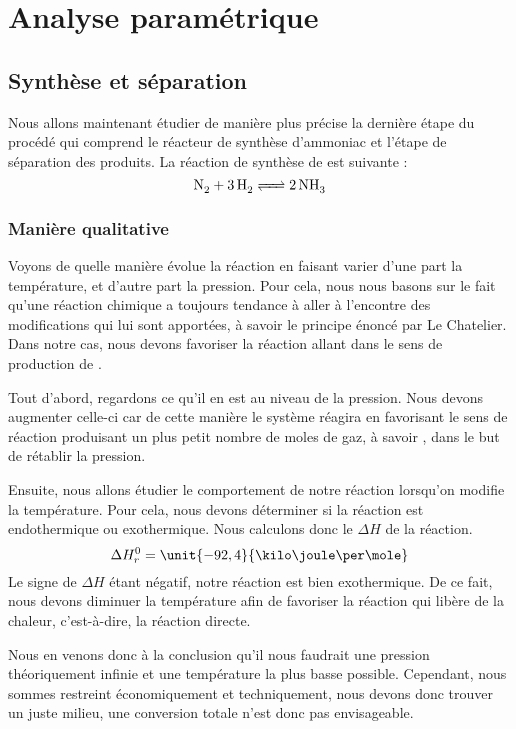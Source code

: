 \chapter{Analyse paramétrique}
\section{Synthèse  et séparation}

Nous allons maintenant étudier de manière plus précise la dernière étape du procédé qui comprend le réacteur de synthèse d’ammoniac et l'étape de séparation des produits.
La réaction de synthèse de  est suivante :
\[ \ce{N_2 + 3H2 <=> 2NH3} \]

\subsection{Manière qualitative}

Voyons de quelle manière évolue la réaction en faisant varier d'une part la température, et d'autre part la pression. Pour cela, nous nous basons sur le fait qu'une réaction chimique a toujours tendance à   aller à l'encontre des modifications qui lui sont apportées, à savoir le principe énoncé par Le Chatelier. Dans notre cas, nous devons favoriser la réaction allant dans le sens de production de .

Tout d'abord, regardons ce qu'il en est au niveau de la pression. Nous devons augmenter celle-ci car de cette manière le système réagira en favorisant le sens de réaction produisant un plus petit nombre de moles de gaz, à savoir , dans le but de rétablir la pression. 

Ensuite, nous allons étudier le comportement de notre réaction lorsqu'on modifie la température. Pour cela, nous devons déterminer si la réaction est endothermique ou exothermique. Nous calculons donc le $\Delta H$  de la réaction.
\[ \Delta H^0_r = \unit{-92,4}{\kilo\joule\per\mole} \]
Le signe de $\Delta H$ étant négatif, notre réaction est bien exothermique. De ce fait, nous devons diminuer la température afin de favoriser la réaction qui libère de la chaleur, c'est-à-dire, la réaction directe.

Nous en venons donc à la conclusion qu'il nous faudrait une pression théoriquement infinie et une température la plus basse possible. Cependant, nous sommes restreint économiquement et techniquement, nous devons donc trouver un juste milieu, une conversion totale n'est donc pas envisageable. 
\\

